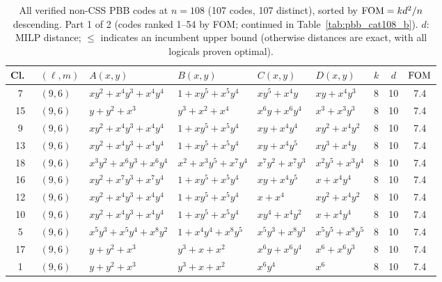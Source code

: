 \begin{table}[t]
\centering
\caption{All verified non-CSS PBB codes at $n = 108$ (107 codes, 107 distinct), sorted by $\mathrm{FOM} = kd^2/n$ descending. Part 1 of 2 (codes ranked 1--54 by FOM; continued in Table~\ref{tab:pbb_cat108_b}).
$d$: MILP distance; $\leq$ indicates an incumbent upper bound (otherwise distances are exact, with all logicals proven optimal).}
\label{tab:pbb_cat108}
\tiny
\renewcommand{\arraystretch}{0.82}
\setlength{\tabcolsep}{1.5pt}
\begin{tabular*}{\textwidth}{@{\extracolsep{\fill}}cllllllcc}
\toprule
Cl.\ & $(\ell,m)$ & $A(x,y)$ & $B(x,y)$ & $C(x,y)$ & $D(x,y)$ & $k$ & $d$ & $\mathrm{FOM}$ \\
\midrule
7 & $(9,6)$ & $xy^{2}{+}x^{4}y^{3}{+}x^{4}y^{4}$ & $1{+}xy^{5}{+}x^{5}y^{4}$ & $xy^{5}{+}x^{4}y$ & $xy{+}x^{4}y^{3}$ & 8 & 10 & 7.4 \\
15 & $(9,6)$ & $y{+}y^{2}{+}x^{3}$ & $y^{3}{+}x^{2}{+}x^{4}$ & $x^{6}y{+}x^{6}y^{4}$ & $x^{3}{+}x^{3}y^{3}$ & 8 & 10 & 7.4 \\
9 & $(9,6)$ & $xy^{2}{+}x^{4}y^{3}{+}x^{4}y^{4}$ & $1{+}xy^{5}{+}x^{5}y^{4}$ & $xy{+}x^{4}y^{4}$ & $xy^{2}{+}x^{4}y^{2}$ & 8 & 10 & 7.4 \\
13 & $(9,6)$ & $xy^{2}{+}x^{4}y^{3}{+}x^{4}y^{4}$ & $1{+}xy^{5}{+}x^{5}y^{4}$ & $xy{+}x^{4}y^{5}$ & $xy^{3}{+}x^{4}y$ & 8 & 10 & 7.4 \\
18 & $(9,6)$ & $x^{3}y^{2}{+}x^{6}y^{3}{+}x^{6}y^{4}$ & $x^{2}{+}x^{3}y^{5}{+}x^{7}y^{4}$ & $x^{7}y^{2}{+}x^{7}y^{3}$ & $x^{2}y^{5}{+}x^{3}y^{4}$ & 8 & 10 & 7.4 \\
16 & $(9,6)$ & $xy^{2}{+}x^{7}y^{3}{+}x^{7}y^{4}$ & $1{+}xy^{5}{+}x^{5}y^{4}$ & $xy{+}x^{4}y^{5}$ & $x{+}x^{4}y^{4}$ & 8 & 10 & 7.4 \\
12 & $(9,6)$ & $xy^{2}{+}x^{4}y^{3}{+}x^{4}y^{4}$ & $1{+}xy^{5}{+}x^{5}y^{4}$ & $x{+}x^{4}$ & $xy^{2}{+}x^{4}y^{2}$ & 8 & 10 & 7.4 \\
10 & $(9,6)$ & $xy^{2}{+}x^{4}y^{3}{+}x^{4}y^{4}$ & $1{+}xy^{5}{+}x^{5}y^{4}$ & $xy^{4}{+}x^{4}y^{2}$ & $x{+}x^{4}y^{4}$ & 8 & 10 & 7.4 \\
5 & $(9,6)$ & $x^{5}y^{3}{+}x^{5}y^{4}{+}x^{8}y^{2}$ & $1{+}x^{4}y^{4}{+}x^{8}y^{5}$ & $x^{5}y^{3}{+}x^{8}y^{3}$ & $x^{5}y^{5}{+}x^{8}y^{5}$ & 8 & 10 & 7.4 \\
17 & $(9,6)$ & $y{+}y^{2}{+}x^{3}$ & $y^{3}{+}x{+}x^{2}$ & $x^{6}y{+}x^{6}y^{4}$ & $x^{6}{+}x^{6}y^{3}$ & 8 & 10 & 7.4 \\
1 & $(9,6)$ & $y{+}y^{2}{+}x^{3}$ & $y^{3}{+}x{+}x^{2}$ & $x^{6}y^{4}$ & $x^{6}$ & 8 & 10 & 7.4 \\

\end{tabular*}
\end{table}
